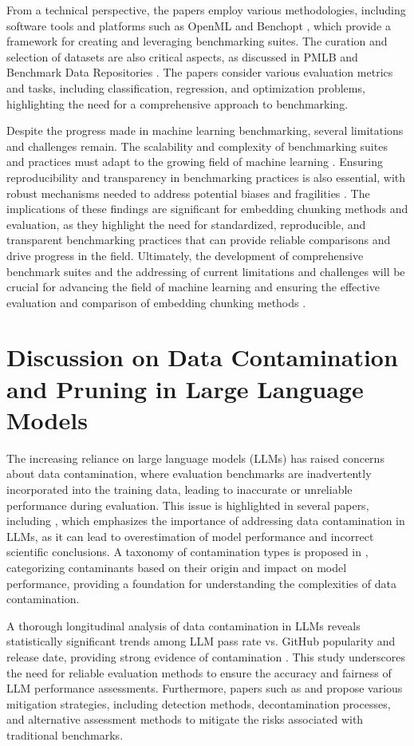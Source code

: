 \documentclass[conference]{IEEEtran}
\begin{document}
From a technical perspective, the papers employ various methodologies, including software tools and platforms such as OpenML \cite{b2} and Benchopt \cite{b8}, which provide a framework for creating and leveraging benchmarking suites. The curation and selection of datasets are also critical aspects, as discussed in PMLB \cite{b3} and Benchmark Data Repositories \cite{b9}. The papers consider various evaluation metrics and tasks, including classification, regression, and optimization problems, highlighting the need for a comprehensive approach to benchmarking.

Despite the progress made in machine learning benchmarking, several limitations and challenges remain. The scalability and complexity of benchmarking suites and practices must adapt to the growing field of machine learning \cite{b10}. Ensuring reproducibility and transparency in benchmarking practices is also essential, with robust mechanisms needed to address potential biases and fragilities \cite{b5}. The implications of these findings are significant for embedding chunking methods and evaluation, as they highlight the need for standardized, reproducible, and transparent benchmarking practices that can provide reliable comparisons and drive progress in the field. Ultimately, the development of comprehensive benchmark suites and the addressing of current limitations and challenges will be crucial for advancing the field of machine learning and ensuring the effective evaluation and comparison of embedding chunking methods \cite{b11}.

\section{Discussion on Data Contamination and Pruning in Large Language Models}
The increasing reliance on large language models (LLMs) has raised concerns about data contamination, where evaluation benchmarks are inadvertently incorporated into the training data, leading to inaccurate or unreliable performance during evaluation. This issue is highlighted in several papers, including \cite{b1}, which emphasizes the importance of addressing data contamination in LLMs, as it can lead to overestimation of model performance and incorrect scientific conclusions. A taxonomy of contamination types is proposed in \cite{b2}, categorizing contaminants based on their origin and impact on model performance, providing a foundation for understanding the complexities of data contamination.

A thorough longitudinal analysis of data contamination in LLMs reveals statistically significant trends among LLM pass rate vs. GitHub popularity and release date, providing strong evidence of contamination \cite{b3}. This study underscores the need for reliable evaluation methods to ensure the accuracy and fairness of LLM performance assessments. Furthermore, papers such as \cite{b4} and \cite{b5} propose various mitigation strategies, including detection methods, decontamination processes, and alternative assessment methods to mitigate the risks associated with traditional benchmarks.
\end{document}
